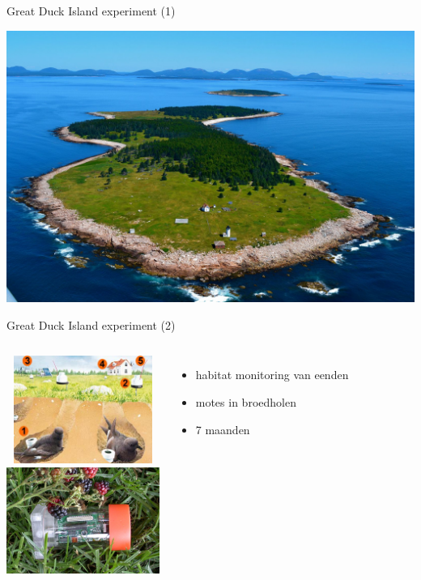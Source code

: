\documentclass[presentation, bigger]{beamer}
\begin{document}
\begin{frame}[label=sec-1-4]{Great Duck Island experiment (1)}

\includegraphics[width=\textwidth,keepaspectration=true]{gdi/gdi.jpg}

\end{frame}
\begin{frame}[label=sec-1-5]{Great Duck Island experiment (2)}
\begin{columns}[t]
\centering
\includegraphics[width=5cm,height=3.5cm]{gdi/gdi_duckmote.jpg}\\
\includegraphics[width=5cm,height=3.5cm]{gdi/micamote.png}
\centering
\begin{itemize}
\item habitat monitoring van eenden
\item motes in broedholen
\item 7 maanden
\end{itemize}
\end{columns}
\end{frame}
\end{document}
